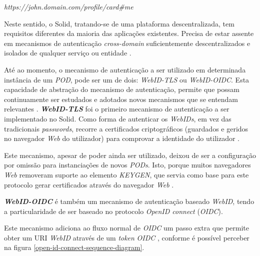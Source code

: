 \begin{center}
    \emph{https://john.domain.com/profile/card\#me}
\end{center}

Neste sentido, o Solid, tratando-se de uma plataforma descentralizada, tem requisitos diferentes da maioria das aplicações existentes. Precisa de estar assente em mecanismos de autenticação \emph{cross-domain} suficientemente descentralizados e isolados de qualquer serviço ou entidade \cite{solid_spec}.

Até ao momento, o mecanismo de autenticação a ser utilizado em determinada instância de um \emph{\acrshort{POD}}, pode ser um de dois: \emph{WebID-TLS} ou \emph{WebID-OIDC}. Esta capacidade de abstração do mecanismo de autenticação, permite que possam continuamente ser estudados e adotados novos mecanismos que se entendam relevantes \cite{solid_spec}.
\newpara
\textbf{\emph{WebID-TLS}} foi o primeiro mecanismo de autenticação a ser implementado no Solid. Como forma de autenticar os \emph{WebIDs}, em vez das tradicionais \emph{passwords}, recorre a certificados criptográficos (guardados e geridos no navegador \emph{Web} do utilizador) para comprovar a identidade do utilizador \cite{solid_webid-tls:}.

Este mecanismo, apesar de poder ainda ser utilizado, deixou de ser a configuração por omissão para instanciações de novos \emph{PODs}. Isto, porque muitos navegadores \emph{Web} removeram suporte ao elemento \emph{KEYGEN}, que servia como base para este protocolo gerar certificados através do navegador \emph{Web} \cite{solid_webid-tls:}.

\newpara
\textbf{\emph{WebID-OIDC}} é também um mecanismo de autenticação baseado \emph{WebID}, tendo a particularidade de ser baseado no protocolo \emph{OpenID connect} (\emph{OIDC}). 

Este mecanismo adiciona ao fluxo normal de \emph{OIDC} um passo extra que permite obter um URI \emph{WebID} através de um \emph{token} \emph{OIDC} \cite{solid_webid_oidc}, conforme é possível perceber na figura \ref{open-id-connect-sequence-diagram}.

